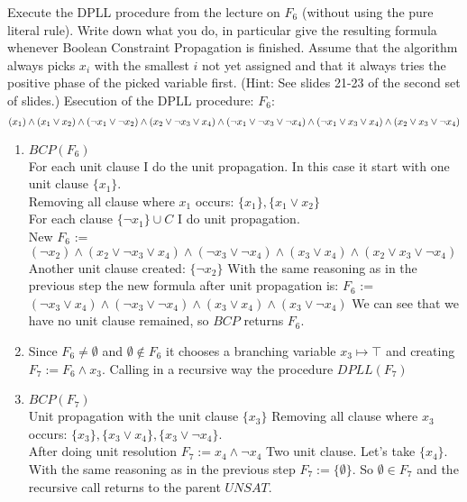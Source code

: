 \documentclass[addpoints,12pt]{exam}
\begin{document}
\begin{questions}
Execute the DPLL procedure from the lecture on $F_6$ (without using the pure literal rule).
Write down what you do, in particular give the
resulting formula whenever Boolean Constraint Propagation is finished. Assume that the
algorithm always picks  $x_i$ with the smallest $i$ not yet assigned and that it always tries
the positive phase of the picked variable first.
(Hint: See slides 21-23 of the second set of slides.)
Esecution of the DPLL procedure:
$F_6$:
\[(x_1) \land (x_1 \lor x_2) \land (\neg x_1 \lor \neg x_2) \land (x_2 \lor \neg x_3 \lor x_4) \\
\land (\neg x_1 \lor \neg x_3 \lor \neg x_4) \land (\neg x_1 \lor x_3 \lor x_4) \land (x_2 \lor x_3 \lor \neg x_4)\]
\begin{enumerate}
    \item $BCP(F_6)$ \\
        For each unit clause I do the unit propagation.
        In this case it start with one unit clause $\{x_1\}$. \\
        Removing all clause where $x_1$ occurs: $\{x_1\},\{x_1 \lor x_2\}$\\
        For each clause $\{\neg x_1\} \cup C$ I do unit propagation. \\
        New $F_6$ := $(\neg x_2)\land (x_2 \lor \neg x_3 \lor x_4)
        \land (\neg x_3 \lor \neg x_4) \land (x_3 \lor x_4) \land (x_2 \lor x_3 \lor \neg x_4)$
        Another unit clause created: $\{\neg x_2\}$
        With the same reasoning as in the previous step the new formula after unit propagation is:
        $F_6$ := $(\neg x_3 \lor x_4)
        \land (\neg x_3 \lor \neg x_4) \land (x_3 \lor x_4) \land (x_3 \lor \neg x_4)$
        We can see that we have no unit clause remained, so $BCP$ returns $F_6$.
    \item Since $F_6 \neq \emptyset$ and $\emptyset \notin F_6$ it chooses a branching variable $x_3 \mapsto \top$ and creating $F_7:=F_6 \land x_3$.
    Calling in a recursive way the procedure $DPLL(F_7)$\\
    \item $BCP(F_7)$ \\
    Unit propagation with the unit clause $\{x_3\}$
    Removing all clause where $x_3$ occurs: $\{x_3\},\{x_3 \lor x_4\},\{x_3 \lor \neg x_4\}$.\\
    After doing unit resolution $F_7:= x_4 \land \neg x_4$
    Two unit clause. Let's take $\{x_4\}$.
    With the same reasoning as in the previous step $F_7:=\{\emptyset\}$.
    So $\emptyset \in F_7$ and the recursive call returns to the parent $UNSAT$.

\end{enumerate}
\end{questions}
\end{document}
